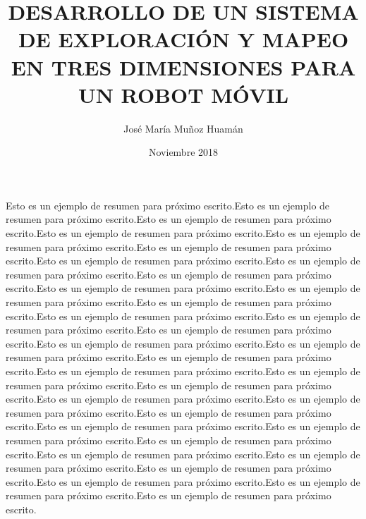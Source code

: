 \documentclass[a4paper, 12pt, oneside]{JMtesis}
\begin{document}
\frontmatter
{}
\title {DESARROLLO DE UN SISTEMA DE EXPLORACIÓN Y MAPEO EN TRES DIMENSIONES PARA UN ROBOT MÓVIL}
\author{Jos\'e Mar\'ia Muñoz Huam\'an}
\date{Noviembre 2018}

\maketitle
{}

%
%
%

\tableofcontents
\listoffigures
\resumen

Esto es un ejemplo de resumen para próximo escrito.Esto es un ejemplo de resumen para próximo 
escrito.Esto es un ejemplo de resumen para próximo escrito.Esto es un ejemplo de resumen para próximo 
escrito.Esto es un ejemplo de resumen para próximo escrito.Esto es un ejemplo de resumen para próximo 
escrito.Esto es un ejemplo de resumen para próximo escrito.Esto es un ejemplo de resumen para próximo 
escrito.Esto es un ejemplo de resumen para próximo escrito.Esto es un ejemplo de resumen para próximo 
escrito.Esto es un ejemplo de resumen para próximo escrito.Esto es un ejemplo de resumen para próximo 
escrito.Esto es un ejemplo de resumen para próximo escrito.Esto es un ejemplo de resumen para próximo 
escrito.Esto es un ejemplo de resumen para próximo escrito.Esto es un ejemplo de resumen para próximo 
escrito.Esto es un ejemplo de resumen para próximo escrito.Esto es un ejemplo de resumen para próximo 
escrito.Esto es un ejemplo de resumen para próximo escrito.Esto es un ejemplo de resumen para próximo 
escrito.Esto es un ejemplo de resumen para próximo escrito.Esto es un ejemplo de resumen para próximo 
escrito.Esto es un ejemplo de resumen para próximo escrito.Esto es un ejemplo de resumen para próximo 
escrito.Esto es un ejemplo de resumen para próximo escrito.Esto es un ejemplo de resumen para próximo 
escrito.Esto es un ejemplo de resumen para próximo escrito.Esto es un ejemplo de resumen para próximo 
escrito.Esto es un ejemplo de resumen para próximo escrito.Esto es un ejemplo de resumen para próximo 
escrito.Esto es un ejemplo de resumen para próximo escrito.Esto es un ejemplo de resumen para próximo 
escrito.Esto es un ejemplo de resumen para próximo escrito.
\end{document}
